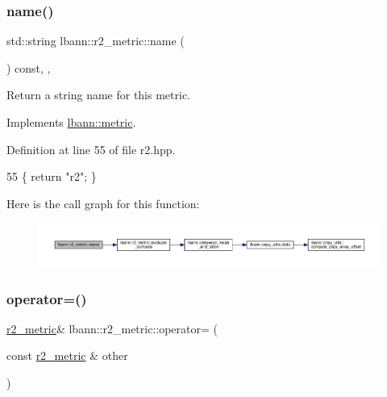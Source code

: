 \subsubsection{\texorpdfstring{name()}{name()}}
{\footnotesize\ttfamily std\+::string lbann\+::r2\+\_\+metric\+::name (\begin{DoxyParamCaption}{ }\end{DoxyParamCaption}) const\hspace{0.3cm}{\ttfamily [inline]}, {\ttfamily [override]}, {\ttfamily [virtual]}}

Return a string name for this metric. 

Implements \hyperlink{classlbann_1_1metric_af455d7b6874d3491bc04f0f2ebfcab51}{lbann\+::metric}.



Definition at line 55 of file r2.\+hpp.


\begin{DoxyCode}
55 \{ \textcolor{keywordflow}{return} \textcolor{stringliteral}{"r2"}; \}
\end{DoxyCode}
Here is the call graph for this function\+:\nopagebreak
\begin{figure}[H]
\begin{center}
\leavevmode
\includegraphics[width=350pt]{classlbann_1_1r2__metric_a66f9280c69b9b079d40b70b9c9c43ad9_cgraph}
\end{center}
\end{figure}
\mbox{\label{classlbann_1_1r2__metric_a83078b4784031fc91f7f145cf22e5571}} 
\subsubsection{\texorpdfstring{operator=()}{operator=()}}
{\footnotesize\ttfamily \hyperlink{classlbann_1_1r2__metric}{r2\+\_\+metric}\& lbann\+::r2\+\_\+metric\+::operator= (\begin{DoxyParamCaption}\item[{const \hyperlink{classlbann_1_1r2__metric}{r2\+\_\+metric} \&}]{other }\end{DoxyParamCaption})\hspace{0.3cm}{\ttfamily [default]}}

